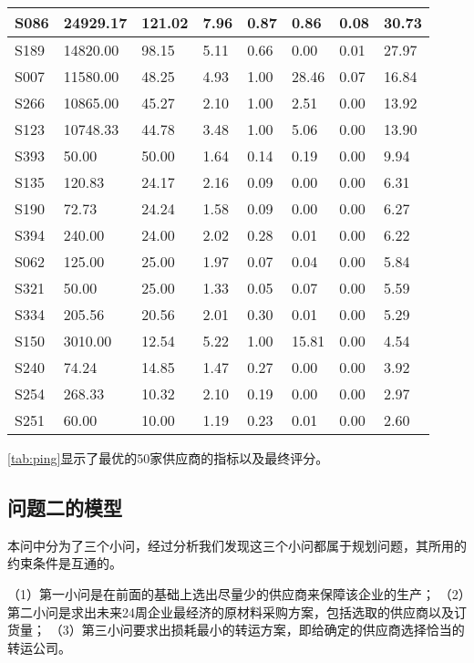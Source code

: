 \documentclass[withoutpreface,bwprint]{cumcmthesis} %
\begin{document}
\begin{longtable}{|l|l|l|l|l|l|l|l|}
        S086 & 24929.17  & 121.02  & 7.96  & 0.87  & 0.86  & 0.08  & 30.73  \\ \hline
        S189 & 14820.00  & 98.15  & 5.11  & 0.66  & 0.00  & 0.01  & 27.97  \\ \hline
        S007 & 11580.00  & 48.25  & 4.93  & 1.00  & 28.46  & 0.07  & 16.84  \\ \hline
        S266 & 10865.00  & 45.27  & 2.10  & 1.00  & 2.51  & 0.00  & 13.92  \\ \hline
        S123 & 10748.33  & 44.78  & 3.48  & 1.00  & 5.06  & 0.00  & 13.90  \\ \hline
        S393 & 50.00  & 50.00  & 1.64  & 0.14  & 0.19  & 0.00  & 9.94  \\ \hline
        S135 & 120.83  & 24.17  & 2.16  & 0.09  & 0.00  & 0.00  & 6.31  \\ \hline
        S190 & 72.73  & 24.24  & 1.58  & 0.09  & 0.00  & 0.00  & 6.27  \\ \hline
        S394 & 240.00  & 24.00  & 2.02  & 0.28  & 0.01  & 0.00  & 6.22  \\ \hline
        S062 & 125.00  & 25.00  & 1.97  & 0.07  & 0.04  & 0.00  & 5.84  \\ \hline
        S321 & 50.00  & 25.00  & 1.33  & 0.05  & 0.07  & 0.00  & 5.59  \\ \hline
        S334 & 205.56  & 20.56  & 2.01  & 0.30  & 0.01  & 0.00  & 5.29  \\ \hline
        S150 & 3010.00  & 12.54  & 5.22  & 1.00  & 15.81  & 0.00  & 4.54  \\ \hline
        S240 & 74.24  & 14.85  & 1.47  & 0.27  & 0.00  & 0.00  & 3.92  \\ \hline
        S254 & 268.33  & 10.32  & 2.10  & 0.19  & 0.00  & 0.00  & 2.97  \\ \hline
        S251 & 60.00  & 10.00  & 1.19  & 0.23  & 0.01  & 0.00  & 2.60  \\ \hline
\end{longtable}

\cref{tab:ping}显示了最优的50家供应商的指标以及最终评分。
\subsection{问题二的模型}
本问中分为了三个小问，经过分析我们发现这三个小问都属于规划问题，其所用的约束条件是互通的。

（1）第一小问是在前面的基础上选出尽量少的供应商来保障该企业的生产；
（2）第二小问是求出未来24周企业最经济的原材料采购方案，包括选取的供应商以及订货量；
（3）第三小问要求出损耗最小的转运方案，即给确定的供应商选择恰当的转运公司。
\end{document}
